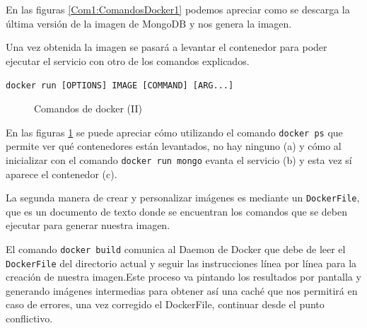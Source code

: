 En las figuras \ref{Com1:ComandosDocker1} podemos apreciar como se descarga la última versión de la imagen de MongoDB y nos genera la imagen. 

Una vez obtenida la imagen se pasará a levantar el contenedor para poder ejecutar el servicio con otro de los comandos explicados. 

\begin{center}
\texttt{docker run [OPTIONS] IMAGE [COMMAND] [ARG...]}
\end{center}
\pagebreak 

\begin{figure}[htb]
\begin{center}
\caption{Comandos de docker (II)}
\label{Com2:ComandosDocker2}
\end{center}
\end{figure}


En las figuras \ref{Com2:ComandosDocker2} se puede apreciar cómo utilizando el comando \texttt{docker ps} que
permite ver qué contenedores están levantados, no hay ninguno (a) y cómo al inicializar con el comando  \texttt{docker run mongo} evanta el servicio (b) y esta vez sí aparece el contenedor (c).
\newline

La segunda manera de crear y personalizar imágenes es mediante un \texttt{DockerFile}, que es un documento de texto donde se encuentran los comandos que se deben ejecutar para generar nuestra imagen.

El comando \texttt{docker build} comunica al Daemon de Docker que debe de leer el \texttt{DockerFile} del directorio actual y seguir las instrucciones línea por línea para la creación de nuestra imagen.Este proceso va pintando los resultados por pantalla y generando imágenes intermedias para obtener así una caché que nos permitirá en caso de errores, una vez corregido el DockerFile, continuar desde el punto conflictivo. 

